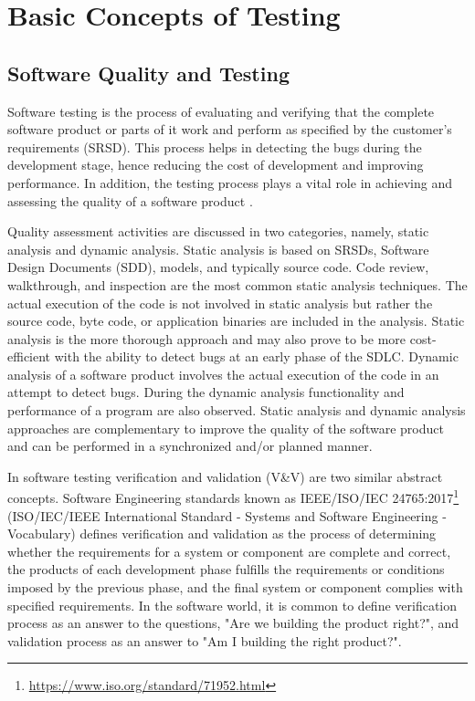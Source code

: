 \chapter{Basic Concepts of Testing}
\section{Software Quality and Testing}
Software testing is the process of evaluating and verifying that the complete software product or parts of it work and perform as specified by the customer's requirements (SRSD). This process helps in detecting the bugs during the development stage, hence reducing the cost of development and improving performance. In addition, the testing process plays a vital role in achieving and assessing the quality of a software
product \autocite{friedman1995software}. 

Quality assessment activities are discussed in two categories, namely, static analysis and dynamic analysis. Static analysis is based on SRSDs, Software Design Documents (SDD), models, and typically source code. Code review, walkthrough, and inspection are the most common static analysis techniques. The actual execution of the code is not involved in static analysis but rather the source code, byte code, or application binaries are included in the analysis. Static analysis is the more thorough approach and may also prove to be more cost-efficient with the ability to detect bugs at an early phase of the SDLC. Dynamic analysis of a software product involves the actual execution of the code in an attempt to detect bugs. During the dynamic analysis functionality and performance of a program are also observed. Static analysis and dynamic analysis approaches are complementary to improve the quality of the software product and can be performed in a synchronized and/or planned manner.

In software testing verification and validation (V\&V) are two similar abstract concepts. Software Engineering standards known as IEEE/ISO/IEC 24765:2017\footnote{\url{https://www.iso.org/standard/71952.html}} (ISO/IEC/IEEE International Standard - Systems and Software Engineering - Vocabulary) defines verification and validation as the process of determining whether the requirements for a system or component are complete and correct, the products of each development phase fulfills the requirements or conditions imposed by the previous phase, and the final system or component complies with specified requirements. In the software world, it is common to define verification process as an answer to the questions, "Are we building the product right?", and validation process as an answer to "Am I building the right product?".

